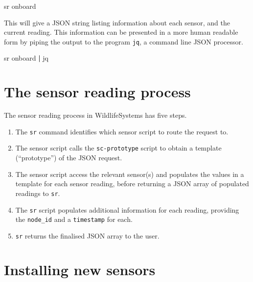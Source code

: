 \documentclass[
]{book}
\newenvironment{Shaded}{\begin{snugshade}}{\end{snugshade}}
\newcommand{\ExtensionTok}[1]{#1}
\newcommand{\KeywordTok}[1]{\textcolor[rgb]{0.13,0.29,0.53}{\textbf{#1}}}
\newcommand{\NormalTok}[1]{#1}
\begin{document}
\begin{Shaded}
\begin{Highlighting}[]
\ExtensionTok{sr}\NormalTok{ onboard}
\end{Highlighting}
\end{Shaded}

This will give a JSON string listing information about each sensor, and the current reading. This information can be presented in a more human readable form by piping the output to the program \texttt{jq}, a command line JSON processor.

\begin{Shaded}
\begin{Highlighting}[]
\ExtensionTok{sr}\NormalTok{ onboard }\KeywordTok{|} \ExtensionTok{jq}
\end{Highlighting}
\end{Shaded}

\hypertarget{the-sensor-reading-process}{%
\section{The sensor reading process}\label{the-sensor-reading-process}}

The sensor reading process in WildlifeSystems has five steps.

\begin{enumerate}
\def\labelenumi{\arabic{enumi}.}
\item
  The \texttt{sr} command identifies which sensor script to route the request to.
\item
  The sensor script calls the \texttt{sc-prototype} script to obtain a template (``prototype'') of the JSON request.
\item
  The sensor script access the relevant sensor(s) and populates the values in a template for each sensor reading, before returning a JSON array of populated readings to \texttt{sr}.
\item
  The \texttt{sr} script populates additional information for each reading, providing the \texttt{node\_id} and a \texttt{timestamp} for each.
\item
  \texttt{sr} returns the finalised JSON array to the user.
\end{enumerate}

\hypertarget{installing-new-sensors}{%
\section{Installing new sensors}\label{installing-new-sensors}}
\end{document}
